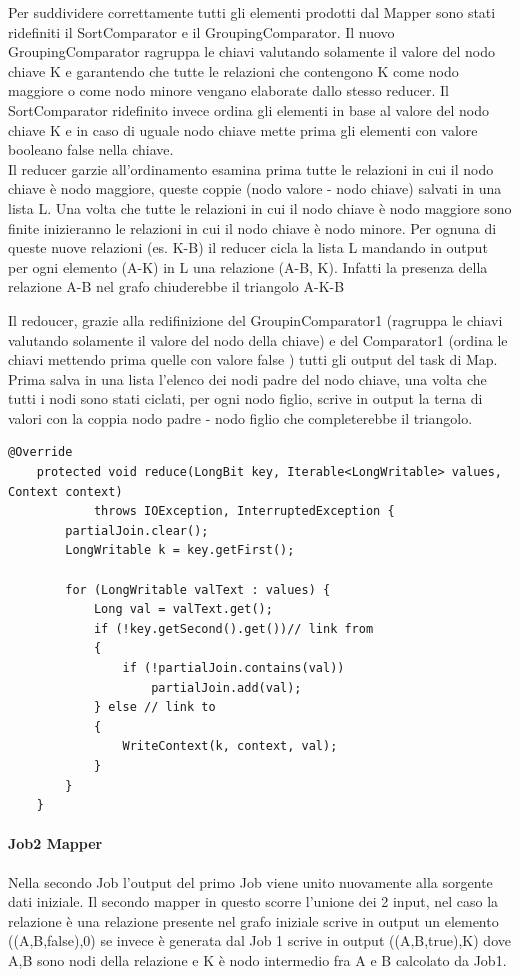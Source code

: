 \documentclass[paper=a4, fontsize=11pt]{scrartcl}	%
\numberwithin{equation}{section}															%
\numberwithin{figure}{section}																%
\numberwithin{table}{section}																%
\begin{document}
Per suddividere correttamente tutti gli elementi prodotti dal Mapper sono stati ridefiniti il SortComparator e il GroupingComparator.
Il nuovo GroupingComparator ragruppa le chiavi valutando solamente il valore del nodo chiave K e garantendo che tutte le relazioni che contengono K come nodo maggiore o come nodo minore vengano elaborate dallo stesso reducer. Il SortComparator ridefinito invece ordina gli elementi in base al valore del nodo chiave K e in caso di uguale nodo chiave mette prima gli elementi con valore booleano false nella chiave.\\ Il reducer  garzie all'ordinamento esamina prima tutte le relazioni in cui il nodo chiave è nodo maggiore, queste coppie (nodo valore - nodo chiave) salvati in una lista L. Una volta che tutte le relazioni in cui il nodo chiave è nodo maggiore sono finite inizieranno le relazioni in cui il nodo chiave è nodo minore. Per ognuna di queste nuove relazioni (es. K-B) il reducer cicla la lista L mandando in output per ogni elemento (A-K) in L una relazione (A-B, K). Infatti la presenza della relazione A-B nel grafo chiuderebbe il triangolo A-K-B 

Il redoucer, grazie alla redifinizione del GroupinComparator1 (ragruppa le chiavi valutando solamente il valore del nodo della chiave) e  del Comparator1 (ordina le chiavi mettendo prima quelle con valore false ) tutti gli output del task di Map. Prima salva in una lista l'elenco dei nodi padre del nodo chiave, una volta che tutti i nodi sono stati ciclati, per ogni nodo figlio, scrive in output la terna di valori con la coppia nodo padre - nodo figlio che completerebbe il triangolo.
\begin{lstlisting}[label=Reducer1,caption=Implementazione del Reducer1]	
	@Override
	protected void reduce(LongBit key, Iterable<LongWritable> values, Context context)
			throws IOException, InterruptedException {
		partialJoin.clear();
		LongWritable k = key.getFirst();

		for (LongWritable valText : values) {
			Long val = valText.get();
			if (!key.getSecond().get())// link from
			{
				if (!partialJoin.contains(val))
					partialJoin.add(val);
			} else // link to
			{
				WriteContext(k, context, val);
			}
		}
	}
\end{lstlisting}
\paragraph{Job2 Mapper}
Nella secondo Job l'output del primo Job viene unito nuovamente alla sorgente dati iniziale. Il secondo mapper in questo scorre l'unione dei 2 input, nel caso la relazione è una relazione presente nel grafo iniziale scrive in output un elemento ((A,B,false),0) se invece è generata dal Job 1 scrive in output  ((A,B,true),K) dove A,B sono nodi della relazione e K è nodo intermedio fra A e B calcolato da Job1.
\end{document}
